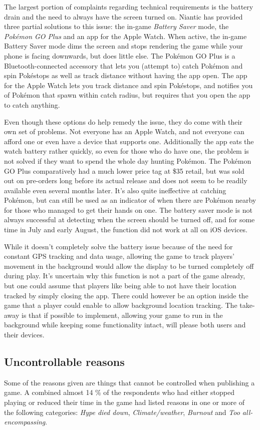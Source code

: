 The largest portion of complaints regarding technical requirements is the battery drain and the need to always have the screen turned on. Niantic has provided three partial solutions to this issue: the in-game \emph{Battery Saver} mode, the \emph{Pokémon GO Plus} and an app for the Apple Watch. When active, the in-game Battery Saver mode dims the screen and stops rendering the game while your phone is facing downwards, but does little else. The Pokémon GO Plus is a Bluetooth-connected accessory that lets you (attempt to) catch Pokémon and spin Pokéstops as well as track distance without having the app open. The app for the Apple Watch lets you track distance and spin Pokéstops, and notifies you of Pokémon that spawn within catch radius, but requires that you open the app to catch anything.

Even though these options do help remedy the issue, they do come with their own set of problems. Not everyone has an Apple Watch, and not everyone can afford one or even have a device that supports one. Additionally the app eats the watch battery rather quickly, so even for those who do have one, the problem is not solved if they want to spend the whole day hunting Pokémon. The Pokémon GO Plus comparatively had a much lower price tag at \$35 retail, but was sold out on pre-orders long before its actual release and does not seem to be readily available even several months later. It's also quite ineffective at catching Pokémon, but can still be used as an indicator of when there are Pokémon nearby for those who managed to get their hands on one. The battery saver mode is not always successful at detecting when the screen should be turned off, and for some time in July and early August, the function did not work at all on iOS devices.

While it doesn't completely solve the battery issue because of the need for constant GPS tracking and data usage, allowing the game to track players' movement in the background would allow the display to be turned completely off during play. It's uncertain why this function is not a part of the game already, but one could assume that players like being able to not have their location tracked by simply closing the app. There could however be an option inside the game that a player could enable to allow background location tracking. The take-away is that if possible to implement, allowing your game to run in the background while keeping some functionality intact, will please both users and their devices.

\subsection{Uncontrollable reasons}
Some of the reasons given are things that cannot be controlled when publishing a game. A combined almost 14 \% of the respondents who had either stopped playing or reduced their time in the game had listed reasons in one or more of the following categories: \emph{Hype died down}, \emph{Climate/weather}, \emph{Burnout} and \emph{Too all-encompassing}.

